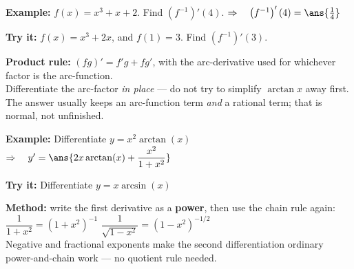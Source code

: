 \documentclass[12pt]{article}
\begin{document}
\begin{examplebox}
\textbf{Example:} \quad $f(x) = x^{3} + x + 2$. Find $\left(f^{-1}\right)'(4)$.
$\Rightarrow\quad \left(f^{-1}\right)'(4) = \ans{\tfrac{1}{4}}$
\end{examplebox}

\begin{tryitbox}
\textbf{Try it:} \quad $f(x) = x^{3} + 2x$, and $f(1) = 3$. Find $\left(f^{-1}\right)'(3)$.\\[2pt]
\end{tryitbox}


\begin{formulabox}
\textbf{Product rule:} $(fg)' = f'g + fg'$, with the arc-derivative used for whichever factor is
the arc-function.\\[3pt]
Differentiate the arc-factor \emph{in place} --- do not try to simplify $\arctan x$ away first. The
answer usually keeps an arc-function term \emph{and} a rational term; that is normal, not
unfinished.
\end{formulabox}

\begin{examplebox}
\textbf{Example:} \quad Differentiate $y = x^{2}\arctan(x)$
$\Rightarrow\quad y' = \ans{2x\arctan(x) + \dfrac{x^{2}}{1 + x^{2}}}$
\end{examplebox}

\begin{tryitbox}
\textbf{Try it:} \quad Differentiate $y = x\arcsin(x)$\\[2pt]
\end{tryitbox}


\begin{formulabox}
\textbf{Method:} write the first derivative as a \textbf{power}, then use the chain rule again:\\[3pt]
$\dfrac{1}{1 + x^{2}} = (1 + x^{2})^{-1}$ \qquad
$\dfrac{1}{\sqrt{1 - x^{2}}} = (1 - x^{2})^{-1/2}$\\[3pt]
Negative and fractional exponents make the second differentiation ordinary power-and-chain work ---
no quotient rule needed.
\end{formulabox}
\end{document}
